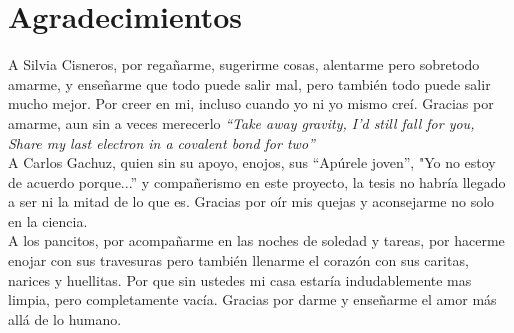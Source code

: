 \documentclass[12pt,letterpaper,final]{article}
\renewenvironment{acknowledgements}
{\newpage\section*{Agradecimientos}\begin{singlespace}\normalsize}
	{\end{singlespace}\par\newpage}
\begin{document}
\begin{acknowledgements}

 
 \vspace*{\fill} \begin{center} \begin{minipage}{\textwidth}\begin{small}  \end{small} \end{minipage} \end{center} \vfill

\newpage

 \vspace*{\fill} \begin{center} \begin{minipage}{\textwidth}\begin{small}  \end{small} \end{minipage} \end{center} \vfill

\newpage


A Silvia Cisneros, por regañarme, sugerirme cosas, alentarme pero sobretodo amarme, y enseñarme que todo puede salir mal, pero también todo puede salir mucho mejor. 
Por creer en mi, incluso cuando yo ni yo mismo creí. Gracias por amarme, aun sin a veces merecerlo \emph{``Take away gravity, I'd still fall for you, Share my last electron in a covalent bond for two''}\\

A Carlos Gachuz, quien sin su apoyo, enojos, sus ``Apúrele joven'', "Yo no estoy de acuerdo porque...''  y compañerismo  en este proyecto, la tesis no habría llegado a ser ni la mitad de lo que es. Gracias por oír mis quejas y aconsejarme no solo en la ciencia. \\

A los pancitos, por acompañarme en las noches de soledad y tareas, por hacerme enojar con sus travesuras pero también llenarme el corazón con sus caritas, narices y huellitas. Por que sin ustedes mi casa estaría indudablemente mas limpia, pero completamente vacía. Gracias por darme y enseñarme el amor más allá de lo humano.\\


\end{acknowledgements}
\end{document}
